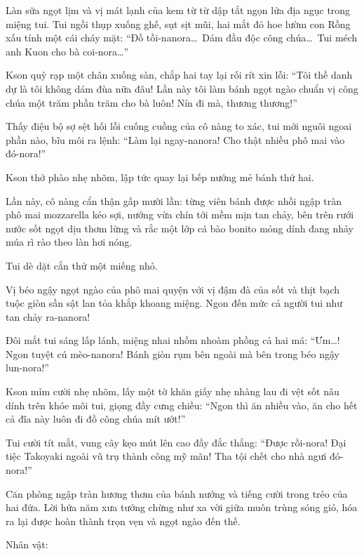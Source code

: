 \documentclass[../main.tex]{subfiles}
\begin{document}
Làn sữa ngọt lịm và vị mát lạnh của kem từ từ dập tắt ngọn lửa địa ngục trong miệng tui. Tui ngồi thụp xuống ghế, sụt sịt mũi, hai mắt đỏ hoe lườm con Rồng xấu tính một cái cháy mặt: ``Đồ tồi-nanora\dots\ Dám đầu độc công chúa\dots\ Tui méch anh Kuon cho bà coi-nora\dots''

Kson quỳ rạp một chân xuống sàn, chắp hai tay lại rối rít xin lỗi: ``Tôi thề danh dự là tôi không dám đùa nữa đâu! Lần này tôi làm bánh ngọt ngào chuẩn vị công chúa một trăm phần trăm cho bà luôn! Nín đi mà, thương thương!''

Thấy điệu bộ sợ sệt hối lỗi cuống cuồng của cô nàng to xác, tui mới nguôi ngoai phần nào, bĩu môi ra lệnh: ``Làm lại ngay-nanora! Cho thật nhiều phô mai vào đó-nora!''

Kson thở phào nhẹ nhõm, lập tức quay lại bếp nướng mẻ bánh thứ hai.

Lần này, cô nàng cẩn thận gấp mười lần: từng viên bánh được nhồi ngập tràn phô mai mozzarella kéo sợi, nướng vừa chín tới mềm mịn tan chảy, bên trên rưới nước sốt ngọt dịu thơm lừng và rắc một lớp cá bào bonito mỏng dính đang nhảy múa rì rào theo làn hơi nóng.

Tui dè dặt cắn thử một miếng nhỏ.

Vị béo ngậy ngọt ngào của phô mai quyện với vị đậm đà của sốt và thịt bạch tuộc giòn sần sật lan tỏa khắp khoang miệng. Ngon đến mức cả người tui như tan chảy ra-nanora!

Đôi mắt tui sáng lấp lánh, miệng nhai nhồm nhoàm phồng cả hai má: ``Ưm\dots! Ngon tuyệt cú mèo-nanora! Bánh giòn rụm bên ngoài mà bên trong béo ngậy lun-nora!''

Kson mỉm cười nhẹ nhõm, lấy một tờ khăn giấy nhẹ nhàng lau đi vệt sốt nâu dính trên khóe môi tui, giọng đầy cưng chiều: ``Ngon thì ăn nhiều vào, ăn cho hết cả đĩa này luôn đi đồ công chúa mít ướt!''

Tui cười tít mắt, vung cây kẹo mút lên cao đầy đắc thắng: ``Được rồi-nora! Đại tiệc Takoyaki ngoài vũ trụ thành công mỹ mãn! Tha tội chết cho nhà ngưi đó-nora!''

Căn phòng ngập tràn hương thơm của bánh nướng và tiếng cười trong trẻo của hai đứa. Lời hứa năm xưa tưởng chừng như xa vời giữa muôn trùng sóng gió, hóa ra lại được hoàn thành trọn vẹn và ngọt ngào đến thế.

\newpage

\begin{center}
  {\caviar\fontsize{12pt}{12pt}\selectfont Nhân vật:  }
\end{center}
\end{document}
